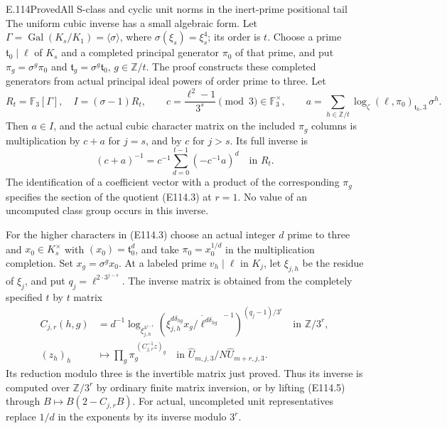 \begin{statement}{E.114}{Proved}{All S-class and cyclic unit norms in the inert-prime positional tail}
The uniform cubic inverse has a small algebraic form.
Let $\Gamma=\operatorname{Gal}(K_s/K_1)=\langle\sigma\rangle$,
where $\sigma(\xi_s)=\xi_s^4$; its order is $t$.
Choose a prime $\mathfrak t_0\mid\ell$ of $K_s$ and a
completed principal generator $\pi_0$ of that prime,
and put $\pi_g=\sigma^g\pi_0$ and
$\mathfrak t_g=\sigma^g\mathfrak t_0$, $g\in\mathbb Z/t$.
The proof constructs these completed generators from
actual principal ideal powers of order prime to three.
Let
\[
 R_t=\mathbb F_3[\Gamma],\quad I=(\sigma-1)R_t,
 \qquad c=\frac{\ell^2-1}{3^s}\pmod3\in\mathbb F_3^\times,
 \qquad
 a=\sum_{h\in\mathbb Z/t}
       \log_\zeta(\ell,\pi_0)_{\mathfrak t_h,3}\,\sigma^h.
 \tag{E114.4}
\]
Then $a\in I$, and the actual cubic character matrix
on the included $\pi_g$ columns is multiplication by
$c+a$ for $j=s$, and by $c$ for $j>s$. Its full inverse is
\[
            (c+a)^{-1}
             =c^{-1}\sum_{d=0}^{t-1}(-c^{-1}a)^d
                      \quad\text{in }R_t.
 \tag{E114.5}
\]
The identification of a coefficient vector with a
product of the corresponding $\pi_g$ specifies the
section of the quotient (E114.3) at $r=1$.
No value of an uncomputed class group occurs in this
inverse.

For the higher characters in (E114.3) choose an actual
integer $d$ prime to three and $x_0\in K_s^\times$
with $(x_0)=\mathfrak t_0^d$, and take
$\pi_0=x_0^{1/d}$ in the multiplication completion.
Set $x_g=\sigma^g x_0$. At a labeled prime $v_h\mid\ell$
in $K_j$, let $\xi_{j,h}$ be the residue of $\xi_j$,
and put $q_j=\ell^{2\cdot3^{j-s}}$.
The inverse matrix is obtained from the completely
specified $t$ by $t$ matrix
\[
 \begin{split}
 C_{j,r}(h,g)
 &=d^{-1}\log_{\xi_{j,h}^{3^{j-r}}}
    \left(
      \xi_{j,h}^{d\delta_{hg}}
       \overline{x_g/\ell^{d\delta_{hg}}}^{\,-1}
    \right)^{(q_j-1)/3^r}
                              \quad\text{in }\mathbb Z/3^r,\\
 (z_h)_h&\longmapsto
     \prod_g\pi_g^{\,(C_{j,r}^{-1}z)_g}
                  \quad\text{in }\widehat U_{m,j,3}/N\widehat U_{m+r,j,3}.
 \end{split}
 \tag{E114.6}
\]
Its reduction modulo three is the invertible matrix
just proved. Thus its inverse is computed over
$\mathbb Z/3^r$ by ordinary finite matrix inversion,
or by lifting (E114.5) through
$B\mapsto B(2-C_{j,r}B)$.
For actual, uncompleted unit representatives replace
$1/d$ in the exponents by its inverse modulo $3^r$.


\end{statement}
